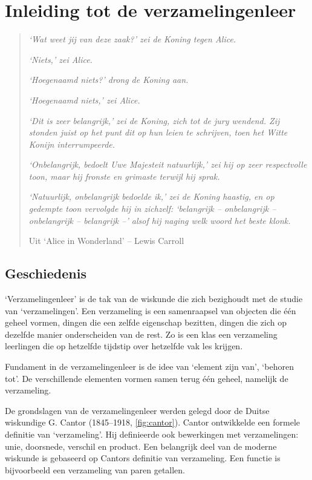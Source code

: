 %
\chapter{Inleiding tot de verzamelingenleer}
\label{chap:verzamelingenleer}
\begin{quote}
\textit{`Wat weet jij van deze zaak?' zei de Koning tegen Alice.}

\textit{`Niets,' zei Alice.}

\textit{`\emph{Hoegenaamd} niets?' drong de Koning aan.}

\textit{`Hoegenaamd niets,' zei Alice.}

\textit{`Dit is zeer belangrijk,' zei de Koning, zich tot de jury wendend. Zij stonden juist op het punt dit op hun leien te schrijven, toen het Witte Konijn interrumpeerde.}

\textit{`\emph{On}belangrijk, bedoelt Uwe Majesteit natuurlijk,' zei hij op zeer respectvolle toon, maar hij fronste en grimaste terwijl hij sprak.}

\textit{`Natuurlijk, onbelangrijk bedoelde ik,' zei de Koning haastig, en op gedempte toon vervolgde hij in zichzelf: `belangrijk -- onbelangrijk -- onbelangrijk -- belangrijk --' alsof hij naging welk woord het beste klonk.}

          Uit `Alice in Wonderland' -- Lewis Carroll
\end{quote}

\newpage
\section{Geschiedenis}
`Verzamelingenleer' is de tak van de wiskunde die zich bezighoudt met de studie van `verzamelingen'. Een verzameling is een samenraapsel van objecten die \'e\'en geheel vormen, dingen die een zelfde eigenschap bezitten, dingen die zich op dezelfde manier onderscheiden van de rest. Zo is een klas een verzameling leerlingen die op hetzelfde tijdstip over hetzelfde vak les krijgen.

Fundament in de verzamelingenleer is de idee van `element zijn van', `behoren tot'. De verschillende elementen vormen samen terug \'e\'en geheel, namelijk de verzameling.

De grondslagen van de verzamelingenleer werden gelegd door de Duitse 
wiskundige G. Cantor (1845--1918, \cref{fig:cantor}). 
Cantor ontwikkelde een formele definitie van `verzameling'. 
Hij definieerde ook bewerkingen met verzamelingen: unie, doorsnede, 
verschil en product. Een belangrijk deel van de moderne wiskunde is 
gebaseerd op Cantors definitie van verzameling.  Een functie is 
bijvoorbeeld een  verzameling van paren getallen.

